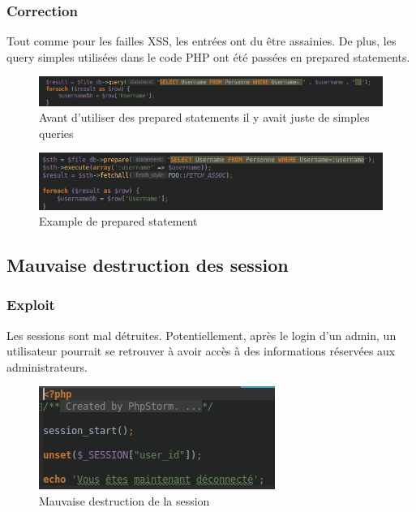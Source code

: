 \documentclass[12pt]{article}
\begin{document}
\subsubsection{Correction}
Tout comme pour les failles XSS, les entrées ont du être assainies. De plus, les query simples utilisées dans le code PHP ont été passées en prepared statements.

\begin{figure}[H]
\centering
\includegraphics[width=\linewidth]{images/simpleQuery.png}
\caption{Avant d'utiliser des prepared statements il y avait juste de simples queries}
\end{figure}

\begin{figure}[H]
\centering
\includegraphics[width=\linewidth]{images/preparedStatement.png}
\caption{Example de prepared statement}
\end{figure}

\subsection{Mauvaise destruction des session}
\subsubsection{Exploit}
Les sessions sont mal détruites. Potentiellement, après le login d'un admin, un utilisateur pourrait se retrouver à avoir accès à des informations réservées aux administrateurs.
\begin{figure}[H]
\centering
\includegraphics[width=\linewidth]{images/unset.png}
\caption{Mauvaise destruction de la session}
\end{figure}
\end{document}
